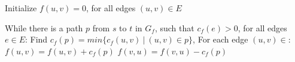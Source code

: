 
\DontPrintSemicolon
\SetAlgoNoLine
\BlankLine
Initialize $f(u,v)=0$, for all edges $(u,v)\in E$\;

While there is a path $p$ from $s$ to $t$ in $G_f$, such that
$c_f(e) > 0$, for all edges $e\in E$:\;
\quad       Find $c_f(p) = min\{ c_f(u,v)\ |\ (u,v) \in p\}$,\;
\quad       For each edge $(u,v) \in $:\;
\quad   \quad        $f(u,v) = f(u,v) + c_f(p)$\;
\quad   \quad        $f(v,u) = f(v,u) - c_f(p)$\;
